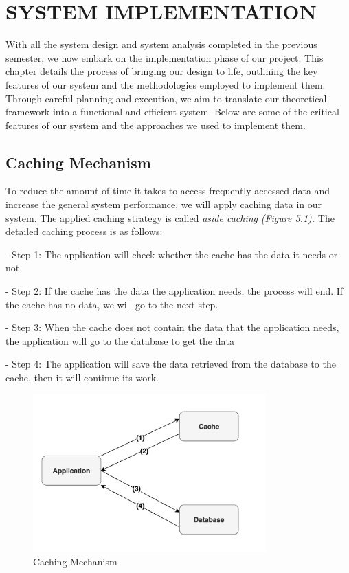 \chapter{SYSTEM IMPLEMENTATION}

With all the system design and system analysis completed in the previous semester, we now embark on the implementation phase of our project. This chapter details the process of bringing our design to life, outlining the key features of our system and the methodologies employed to implement them. Through careful planning and execution, we aim to translate our theoretical framework into a functional and efficient system. Below are some of the critical features of our system and the approaches we used to implement them.


\section{Caching Mechanism}

To reduce the amount of time it takes to access frequently accessed data
and increase the general system performance, we will apply caching data
in our system. The applied caching strategy is called \emph{aside
    caching} \emph{(Figure 5.1).} The detailed caching process is as follows:

- Step 1: The application will check whether the cache has the data it
needs or not.

- Step 2: If the cache has the data the application needs, the process
will end. If the cache has no data, we will go to the next step.

- Step 3: When the cache does not contain the data that the application
needs, the application will go to the database to get the data

- Step 4: The application will save the data retrieved from the database
to the cache, then it will continue its work.

\begin{figure}[H]
    \centering
    \includegraphics[width=0.8\textwidth]{Figures/caching_strat.png}
    \caption{Caching Mechanism}
\end{figure}

